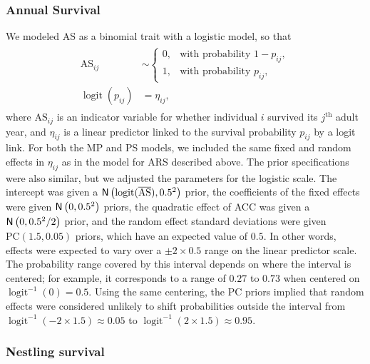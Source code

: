 \documentclass[dvipsnames]{article}
\begin{document}
\subsubsection*{Annual Survival}

We modeled AS as a binomial trait with a logistic model, so that
\begin{align}
\begin{split}
\label{eq-as}
\mathrm{AS}_{ij} &\sim
\begin{cases}
0, & \text{with probability } 1 - p_{ij},\\[-10pt]
1, & \text{with probability } p_{ij},
\end{cases}
\\[-5pt]
\operatorname{logit}(p_{ij}) &= \eta_{ij},
\end{split}
\end{align}
where $\mathrm{AS}_{ij}$ is an indicator variable for whether individual $i$ survived its $j^\text{th}$ adult year, and $\eta_{ij}$ is a linear predictor linked to the survival probability $p_{ij}$ by a logit link.
For both the MP and PS models, we included the same fixed and random effects in $\eta_{ij}$ as in the model for ARS described above.
The prior specifications were also similar, but we adjusted the parameters for the logistic scale.
The intercept was given a $\mathsf{N}\left(\operatorname{logit}(\overline{\mathrm{AS}}), 0.5^2\right)$ prior, the coefficients of the fixed effects were given $\mathsf{N}\left(0, 0.5^2\right)$ priors, the quadratic effect of ACC was given a $\mathsf{N}\left(0, 0.5^2/2\right)$ prior, and the random effect standard deviations were given $\mathrm{PC}(1.5, 0.05)$ priors, which have an expected value of $0.5$.
In other words, effects were expected to vary over a $\pm 2 \times 0.5$ range on the linear predictor scale.
The probability range covered by this interval depends on where the interval is centered; for example, it corresponds to a range of $0.27$ to $0.73$ when centered on $\operatorname{logit}^{-1}(0)=0.5$.
Using the same centering, the PC priors implied that random effects were considered unlikely to shift probabilities outside the interval from $\operatorname{logit}^{-1}(-2\times1.5)\approx0.05$ to $\operatorname{logit}^{-1}(2\times1.5)\approx0.95$.

\subsubsection*{Nestling survival}
\end{document}
